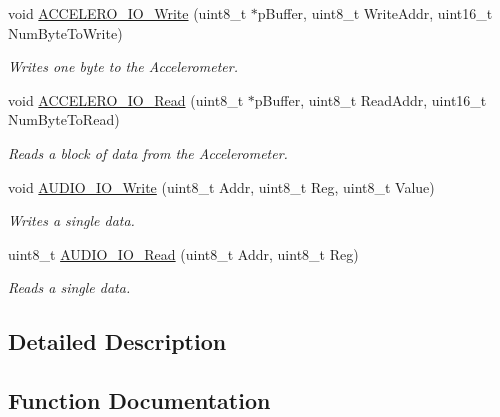 \begin{DoxyCompactItemize}
void \mbox{\hyperlink{group___s_t_m32_f4___d_i_s_c_o_v_e_r_y___l_o_w___l_e_v_e_l___b_u_s___functions_gaeedea8061d4abde8cd304b454334ae42}{A\+C\+C\+E\+L\+E\+R\+O\+\_\+\+I\+O\+\_\+\+Write}} (uint8\+\_\+t $\ast$p\+Buffer, uint8\+\_\+t Write\+Addr, uint16\+\_\+t Num\+Byte\+To\+Write)
\begin{DoxyCompactList}\small\item\em Writes one byte to the Accelerometer. \end{DoxyCompactList}\item 
void \mbox{\hyperlink{group___s_t_m32_f4___d_i_s_c_o_v_e_r_y___l_o_w___l_e_v_e_l___b_u_s___functions_ga78371d00a01f2a0cdd613306e4c4e58f}{A\+C\+C\+E\+L\+E\+R\+O\+\_\+\+I\+O\+\_\+\+Read}} (uint8\+\_\+t $\ast$p\+Buffer, uint8\+\_\+t Read\+Addr, uint16\+\_\+t Num\+Byte\+To\+Read)
\begin{DoxyCompactList}\small\item\em Reads a block of data from the Accelerometer. \end{DoxyCompactList}\item 
void \mbox{\hyperlink{group___s_t_m32_f4___d_i_s_c_o_v_e_r_y___l_o_w___l_e_v_e_l___b_u_s___functions_ga269d6aa92989351e75f6d58378e3b9ba}{A\+U\+D\+I\+O\+\_\+\+I\+O\+\_\+\+Write}} (uint8\+\_\+t Addr, uint8\+\_\+t Reg, uint8\+\_\+t Value)
\begin{DoxyCompactList}\small\item\em Writes a single data. \end{DoxyCompactList}\item 
uint8\+\_\+t \mbox{\hyperlink{group___s_t_m32_f4___d_i_s_c_o_v_e_r_y___l_o_w___l_e_v_e_l___b_u_s___functions_gaf8740cdd8dfc7929d23d52d6fcf0901f}{A\+U\+D\+I\+O\+\_\+\+I\+O\+\_\+\+Read}} (uint8\+\_\+t Addr, uint8\+\_\+t Reg)
\begin{DoxyCompactList}\small\item\em Reads a single data. \end{DoxyCompactList}\end{DoxyCompactItemize}


\subsection{Detailed Description}


\subsection{Function Documentation}
\mbox{\label{group___s_t_m32_f4___d_i_s_c_o_v_e_r_y___l_o_w___l_e_v_e_l___b_u_s___functions_ga78371d00a01f2a0cdd613306e4c4e58f}} 
